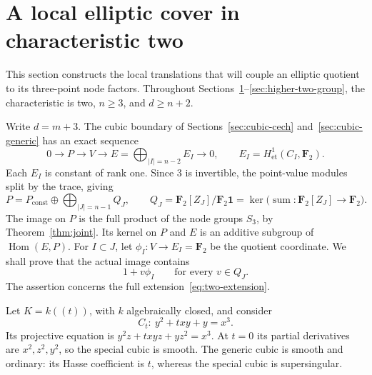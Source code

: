 \section{A local elliptic cover in characteristic two}\label{sec:higher-two-local}
This section constructs the local translations that will couple an elliptic quotient to its three-point node factors. Throughout Sections~\ref{sec:higher-two-local}--\ref{sec:higher-two-group}, the characteristic is two, $n\ge3$, and $d\ge n+2$.

Write $d=m+3$. The cubic boundary of Sections~\ref{sec:cubic-cech} and~\ref{sec:cubic-generic} has an exact sequence
\begin{equation}\label{eq:two-extension}
0\longrightarrow P\longrightarrow V\longrightarrow
E=\bigoplus_{|I|=n-2} E_I\longrightarrow0,
\qquad E_I=H^1_{\mathrm{et}}(C_I,\mathbf F_2).
\end{equation}
Each $E_I$ is constant of rank one. Since $3$ is invertible, the point-value modules split by the trace, giving
\[
P=P_{\mathrm{const}}\oplus\bigoplus_{|J|=n-1}Q_J,
\qquad Q_J=\mathbf F_2[Z_J]/\mathbf F_2\mathbf1
       =\ker\bigl(\operatorname{sum}:\mathbf F_2[Z_J]\to\mathbf F_2\bigr).
\]
The image on $P$ is the full product of the node groups $S_3$, by Theorem~\ref{thm:joint}. Its kernel on $P$ and $E$ is an additive subgroup of $\operatorname{Hom}(E,P)$. For $I\subset J$, let $\phi_I:V\to E_I=\mathbf F_2$ be the quotient coordinate. We shall prove that the actual image contains
\begin{equation}\label{eq:two-supported}
1+v\phi_I\qquad\text{for every }v\in Q_J.
\end{equation}
The assertion concerns the full extension~\eqref{eq:two-extension}.

Let $K=k((t))$, with $k$ algebraically closed, and consider
\[
C_t:\ y^2+txy+y=x^3.
\]
Its projective equation is $y^2z+txyz+yz^2=x^3$. At $t=0$ its partial derivatives are $x^2,z^2,y^2$, so the special cubic is smooth. The generic cubic is smooth and ordinary: its Hasse coefficient is $t$, whereas the special cubic is supersingular.

